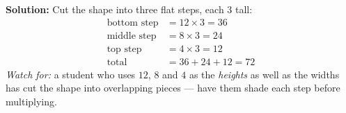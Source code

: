 \documentclass[12pt]{article}
\begin{document}
\textbf{Solution:} Cut the shape into three flat steps, each $3$ tall:
\begin{align*}
\text{bottom step} &= 12 \times 3 = 36 \\
\text{middle step} &= 8 \times 3 = 24 \\
\text{top step} &= 4 \times 3 = 12 \\
\text{total} &= 36 + 24 + 12 = 72
\end{align*}
\emph{Watch for:} a student who uses $12$, $8$ and $4$ as the \emph{heights} as well as the widths
has cut the shape into overlapping pieces --- have them shade each step before multiplying.
\end{document}
